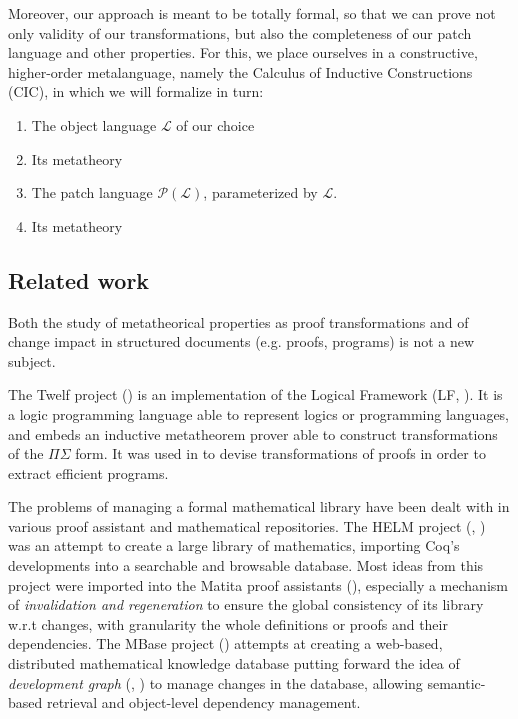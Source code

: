 \documentclass[twoside,a4paper,12pt]{article}
\begin{document}
Moreover, our approach is meant to be totally formal, so that we can
prove not only validity of our transformations, but also the
completeness of our patch language and other properties. For this, we
place ourselves in a constructive, higher-order metalanguage, namely
the Calculus of Inductive Constructions (CIC), in which we will
formalize in turn:
\begin{enumerate}
\item The object language $\mathcal L$ of our choice
\item Its metatheory
\item The patch language $\mathcal P(\mathcal L)$, parameterized by
  $\mathcal L$.
\item Its metatheory
\end{enumerate}


\subsection{Related work}

Both the study of metatheorical properties as proof transformations
and of change impact in structured documents (e.g. proofs, programs)
is not a new subject.

The \textsf{Twelf} project (\cite{pfenning1999system}) is an
implementation of the Logical Framework (LF,
\cite{harper1993framework}). It is a logic programming language able
to represent logics or programming languages, and embeds an inductive
metatheorem prover able to construct transformations of the
$\Pi\Sigma$ form. It was used in \cite{anderson1993program} to devise
transformations of proofs in order to extract efficient programs.

The problems of managing a formal mathematical library have been dealt
with in various proof assistant and mathematical repositories. The
HELM project (\cite{asperti2000content}, \cite{asperti2006content})
was an attempt to create a large library of mathematics, importing
\textsf{Coq}'s developments into a searchable and browsable database.
Most ideas from this project were imported into the \textsf{Matita}
proof assistants (\cite{asperti2007hop}), especially a mechanism of
\emph{invalidation and regeneration} to ensure the global consistency
of its library w.r.t changes, with granularity the whole definitions
or proofs and their dependencies. The MBase project
(\cite{kohlhase2001mbase}) attempts at creating a web-based,
distributed mathematical knowledge database putting forward the idea
of \emph{development graph} (\cite{hutter2000management},
\cite{autexier2000towards}) to manage changes in the database,
allowing semantic-based retrieval and object-level dependency
management.
\end{document}
